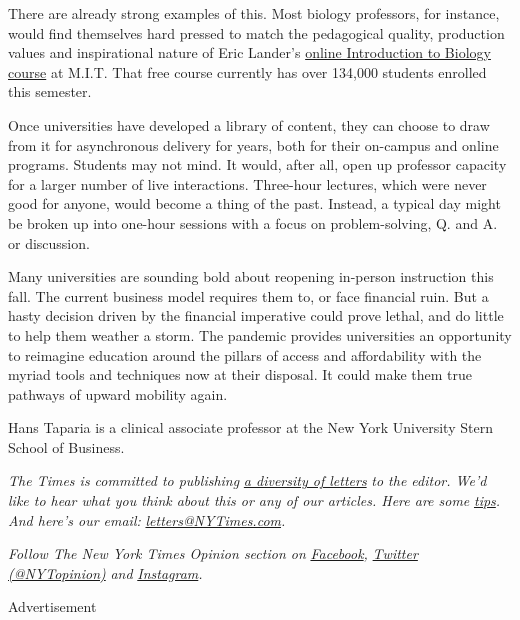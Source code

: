 There are already strong examples of this. Most biology professors, for
instance, would find themselves hard pressed to match the pedagogical
quality, production values and inspirational nature of Eric Lander's
\href{https://www.edx.org/course/introduction-to-biology-the-secret-of-life-3}{online
Introduction to Biology course} at M.I.T. That free course currently has
over 134,000 students enrolled this semester.

Once universities have developed a library of content, they can choose
to draw from it for asynchronous delivery for years, both for their
on-campus and online programs. Students may not mind. It would, after
all, open up professor capacity for a larger number of live
interactions. Three-hour lectures, which were never good for anyone,
would become a thing of the past. Instead, a typical day might be broken
up into one-hour sessions with a focus on problem-solving, Q. and A. or
discussion.

Many universities are sounding bold about reopening in-person
instruction this fall. The current business model requires them to, or
face financial ruin. But a hasty decision driven by the financial
imperative could prove lethal, and do little to help them weather a
storm. The pandemic provides universities an opportunity to reimagine
education around the pillars of access and affordability with the myriad
tools and techniques now at their disposal. It could make them true
pathways of upward mobility again.

Hans Taparia is a clinical associate professor at the New York
University Stern School of Business.

\emph{The Times is committed to publishing}
\href{https://www.nytimes3xbfgragh.onion/2019/01/31/opinion/letters/letters-to-editor-new-york-times-women.html}{\emph{a
diversity of letters}} \emph{to the editor. We'd like to hear what you
think about this or any of our articles. Here are some}
\href{https://help.nytimes3xbfgragh.onion/hc/en-us/articles/115014925288-How-to-submit-a-letter-to-the-editor}{\emph{tips}}\emph{.
And here's our email:}
\href{mailto:letters@NYTimes.com}{\emph{letters@NYTimes.com}}\emph{.}

\emph{Follow The New York Times Opinion section on}
\href{https://www.facebookcorewwwi.onion/nytopinion}{\emph{Facebook}}\emph{,}
\href{http://twitter.com/NYTOpinion}{\emph{Twitter (@NYTopinion)}}
\emph{and}
\href{https://www.instagram.com/nytopinion/}{\emph{Instagram}}\emph{.}

Advertisement

